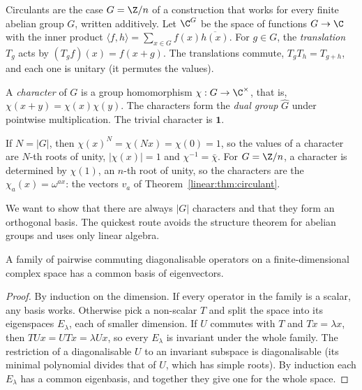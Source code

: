 Circulants are the case $G=\Z/n$ of a construction that works for every finite abelian group $G$, written additively. Let $\C^G$
be the space of functions $G\to\C$ with the inner product $\langle f,h\rangle=\sum_{x\in G}f(x)\overline{h(x)}$. For $g\in G$, the
\emph{translation} $T_g$ acts by $(T_gf)(x)=f(x+g)$. The translations commute, $T_gT_h=T_{g+h}$, and each one is unitary (it
permutes the values).

\begin{definition}\label{linear:def:character}
A \emph{character} of $G$ is a group homomorphism $\chi:G\to\C^\times$, that is, $\chi(x+y)=\chi(x)\chi(y)$. The characters form
the \emph{dual group} $\widehat G$ under pointwise multiplication. The trivial character is $\mathbf 1$.
\end{definition}

If $N=|G|$, then $\chi(x)^N=\chi(Nx)=\chi(0)=1$, so the values of a character are $N$-th roots of unity, $|\chi(x)|=1$ and
$\chi^{-1}=\bar\chi$. For $G=\Z/n$, a character is determined by $\chi(1)$, an $n$-th root of unity, so the characters are the
$\chi_a(x)=\omega^{ax}$: the vectors $v_a$ of Theorem~\ref{linear:thm:circulant}.

We want to show that there are always $|G|$ characters and that they form an orthogonal basis. The quickest route avoids the
structure theorem for abelian groups and uses only linear algebra.

\begin{lemma}\label{linear:lem:commuting}
A family of pairwise commuting diagonalisable operators on a finite-dimensional complex space has a common basis of eigenvectors.
\end{lemma}
\begin{proof}
By induction on the dimension. If every operator in the family is a scalar, any basis works. Otherwise pick a non-scalar $T$
and split the space into its eigenspaces $E_\lambda$, each of smaller dimension. If $U$ commutes with $T$ and $Tx=\lambda x$,
then $TUx=UTx=\lambda Ux$, so every $E_\lambda$ is invariant under the whole family. The restriction of a diagonalisable $U$ to an
invariant subspace is diagonalisable (its minimal polynomial divides that of $U$, which has simple roots). By induction each
$E_\lambda$ has a common eigenbasis, and together they give one for the whole space.
\end{proof}

